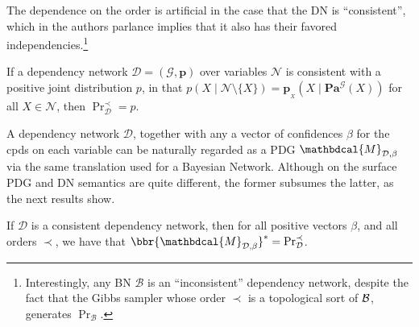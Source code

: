 \documentclass[letterpaper]{article} %
\theoremstyle{plain}
\newtheorem{lemma}[theorem]{Lemma}
\theoremstyle{definition}
\theoremstyle{remark}
\newcommand{\begthm}[3][]{\begin{#2}[{name=#1},restate=#3,label=#3]}
\newcommand{\valpha}[1]{{\color{red!80!black}#1}}
\newcommand\mat[1]{\mathbf{#1}}
\newcommand{\dg}[1]{\mathbdcal{#1}}
\newcommand\Pa{\mathbf{Pa}}
\newcommand{\bp}[1][L]{\mat{p}_{\!_{#1}\!}}
\newcommand{\V}{\mathcal V}
\newcommand{\N}{\mathcal N}
\newcommand{\Ed}{\mathcal E}
\newcommand{\Gr}{\mathcal G}
\newcommand{\IDef}[1]{\mathit{IDef}_{\!#1}}
\newcommand{\PDGof}[1]{{\dg M}_{#1}}
\begin{document}
The dependence on the order is artificial in the case that the DN is ``consistent'', which in the authors parlance implies that it also has their favored independencies.\footnote{Interestingly, any BN $\mathcal B$ is an ``inconsistent'' dependency network, despite the fact that the Gibbs sampler whose order $\prec$ is a topological sort  of $\cal B$, generates $\Pr_{\mathcal B}$.}

\begthm[\citeauthor{heckerman2000dependency}]{theorem}{thm:dns-uniq}
If a dependency network $\mathcal D \!=\! (\Gr, \mat p)$ over variables $\N$ is consistent with a positive joint distribution $p$,
in that $p(X \mid \N\setminus \{X\}) = \bp[X](X \mid \Pa^{\Gr}(X))$ for all $X \in \N$,
 then $\Pr_{\mathcal D}^\prec = p$.
\end{theorem}

A dependency network $\mathcal D$, together with any a vector of confidences $\beta$ for the cpds on each variable
can be naturally regarded as a PDG $\PDGof{\mathcal D, \beta}$ 
via the same translation used for a Bayesian Network.
Although on the surface PDG and DN semantics are quite
different,
the former subsumes the latter, as the next results show.




\begthm{conj}{thm:dns-are-pdgs}
If $\mathcal D$ is a consistent dependency network,
then for all positive vectors $\beta$, and all orders $\prec$, we have that
$\bbr{\PDGof{\mathcal D, \beta}}^* =  \Pr_{\cal D}^\prec$.
\end{conj}
\end{document}
